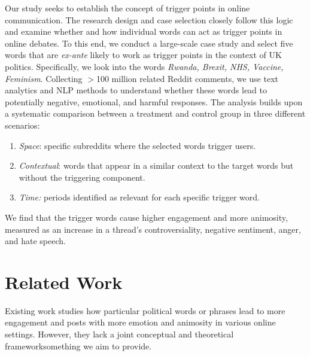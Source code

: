 Our study seeks to establish the concept of trigger points in online communication. The research design and case selection closely follow this logic and examine whether and how individual words can act as trigger points in online debates. To this end, we conduct a large-scale case study and select five words that are \emph{ex-ante} likely to work as trigger points in the context of UK politics. Specifically, we look into the words \textit{Rwanda, Brexit, NHS, Vaccine, Feminism}. Collecting $>$100 million related Reddit comments, we use text analytics and NLP methods to understand whether these words lead to potentially negative, emotional, and harmful responses. The analysis builds upon a systematic comparison between a treatment and control group in three different scenarios:
\begin{enumerate}
    \item \textit{Space}: specific subreddits where the selected words trigger users.
    \item \textit{Contextual}: words that appear in a similar context to the target words but without the triggering component.
    \item \textit{Time:} periods identified as relevant for each specific trigger word. 
\end{enumerate}

We find that the trigger words cause higher engagement and more animosity, measured as an increase in a thread's controversiality, negative sentiment, anger, and hate speech.



\section{Related Work}
Existing work studies how particular political words or phrases lead to more engagement \cite{Brady17, Hameleeres21} and posts with more emotion and animosity \cite{friedman2004positive, Martin_Huck_Williams_Hull_Hull_2021, Schroth2005stones, Rho20} in various online settings. However, they lack a joint conceptual and theoretical framework\textemdash something we aim to provide.





